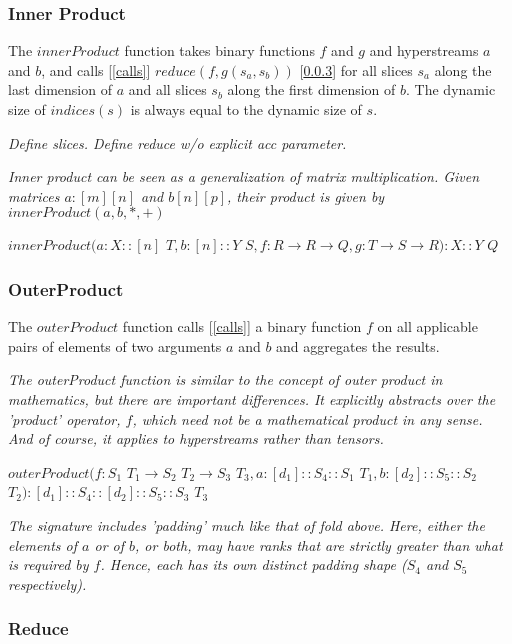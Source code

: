 \documentclass{article}
\begin{document}
\subsubsection{Inner Product}
\label{innerProduct}

The $innerProduct$ function takes binary functions $f$ and $g$ and hyperstreams $a$ and $b$, and calls [\ref{calls}] $reduce(f, g(s_a, s_b))$ [\ref{reduce}] for all slices $s_a$ along the last dimension of  $a$ and all slices  $s_b$ along the first dimension of $b$. The dynamic size  of $indices(s)$ is  always equal to the dynamic size of $s$.


{\em Define slices. Define reduce w/o explicit acc parameter.}

{\em Inner product can be seen as a generalization of matrix multiplication.  Given matrices $a: [m][n]$ and $b[n][p]$, their product is given by
 $innerProduct(a, b, *, +)$

}

$innerProduct(a: X:: [n]$ $T, b: [n]::Y$ $S,  f: R \to R \to Q, g: T \to S \to R): X::Y$ $Q$

\subsubsection{OuterProduct}
\label{outerProduct}

The $outerProduct$ function calls [\ref{calls}] a binary function $f$ on all applicable pairs of elements of two arguments $a$ and $b$ and aggregates the results.

{\em
The outerProduct function is similar to the concept of outer product in mathematics, but there are important differences. It explicitly abstracts over the 'product' operator, $f$, which need not be a mathematical product in any sense. And of course, it applies to hyperstreams rather than tensors.
}

$outerProduct(f: S_1 $ $T_1 \to{} S_2 $ $T_2 \to{} S_3 $ $T_3, a: [d_1]::S_4::S_1 $ $T_1, b: [d_2]::S_5::S_2 $ $T_2): [d_1]::S_4::[d_2]::S_5::S_3 $ $T_3$

{\em
The signature includes 'padding' much like that of fold above. Here, either the elements of $a$ or of $b$, or both, may have ranks that are strictly greater than what is required by $f$.
Hence, each has its own distinct padding shape ($S_4$ and $S_5$ respectively).
}


\subsubsection{Reduce}
\label{reduce}
\end{document}
